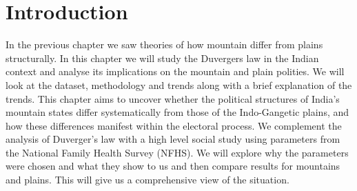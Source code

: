 \section{Introduction}
In the previous chapter we saw theories of how mountain differ from plains structurally. In this chapter we will study the Duvergers law in the Indian context and analyse its implications on the mountain and plain polities.  We will look at the dataset, methodology and trends along with a brief explanation of the trends. This chapter aims to uncover whether the political structures of India's mountain states differ systematically from those of the Indo-Gangetic plains, and how these differences manifest within the electoral process.  We complement the analysis of Duverger's law with a high level social study using parameters from the National Family Health Survey (NFHS). We will explore why the parameters were chosen and what they show to us and then compare results for mountains and plains. This will give us a comprehensive view of the situation.
